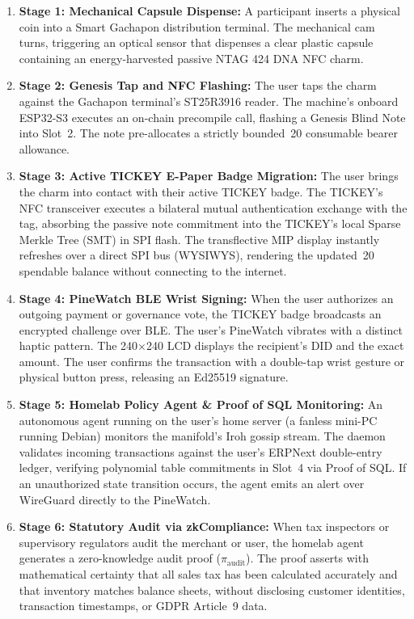 \documentclass[a4paper,11pt,twoside,parskip=half-,headings=small]{scrartcl}
\newcommand{\EUR}[1]{\texteuro\,#1}
\begin{document}
\begin{enumerate}
  \item \textbf{Stage 1: Mechanical Capsule Dispense:} A participant inserts a physical
coin into a Smart Gachapon distribution terminal. The mechanical cam turns,
triggering an optical sensor that dispenses a clear plastic capsule containing
an energy-harvested passive NTAG 424 DNA NFC charm.
  \item \textbf{Stage 2: Genesis Tap and NFC Flashing:} The user taps the charm against the
Gachapon terminal's ST25R3916 reader. The machine's onboard ESP32-S3 executes an
on-chain precompile call, flashing a Genesis Blind Note into Slot~2. The note
pre-allocates a strictly bounded \EUR{20} consumable bearer allowance.
  \item \textbf{Stage 3: Active TICKEY E-Paper Badge Migration:} The user brings the charm
into contact with their active TICKEY badge. The TICKEY's NFC transceiver executes
a bilateral mutual authentication exchange with the tag, absorbing the passive note
commitment into the TICKEY's local Sparse Merkle Tree (SMT) in SPI flash. The
transflective MIP display instantly refreshes over a direct SPI bus (WYSIWYS),
rendering the updated \EUR{20} spendable balance without connecting to the internet.
  \item \textbf{Stage 4: PineWatch BLE Wrist Signing:} When the user authorizes an outgoing
payment or governance vote, the TICKEY badge broadcasts an encrypted challenge over BLE.
The user's PineWatch vibrates with a distinct haptic pattern. The 240$\times$240
LCD displays the recipient's DID and the exact amount. The user confirms the transaction
with a double-tap wrist gesture or physical button press, releasing an Ed25519 signature.
  \item \textbf{Stage 5: Homelab Policy Agent \& Proof of SQL Monitoring:} An autonomous agent
running on the user's home server (a fanless mini-PC running Debian) monitors the
manifold's Iroh gossip stream. The daemon validates incoming transactions against
the user's ERPNext double-entry ledger, verifying polynomial table commitments in
Slot~4 via Proof of SQL. If an unauthorized state transition occurs, the agent emits an
alert over WireGuard directly to the PineWatch.
  \item \textbf{Stage 6: Statutory Audit via zkCompliance:} When tax inspectors or supervisory
regulators audit the merchant or user, the homelab agent generates a zero-knowledge
audit proof ($\pi_{\text{audit}}$). The proof asserts with mathematical certainty that
all sales tax has been calculated accurately and that inventory matches balance sheets,
without disclosing customer identities, transaction timestamps, or GDPR Article~9 data.
\end{enumerate}
\end{document}
